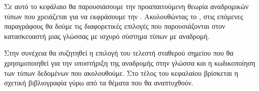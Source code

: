 Σε αυτό το κεφάλαιο θα παρουσιάσουμε την προαπαιτούμενη θεωρία αναδρομικών
τύπων που χρειάζεται για να εκφράσουμε την \FOMF. Ακολουθώντας το \cite{tapl},
στις επόμενες παραγράφους θα δούμε τις διαφορετικές επιλογές που παρουσιάζονται
στον κατασκευαστή μιας γλώσσας με ισχυρό σύστημα τύπων με αναδρομή.

Στην συνέχεια θα συζητηθεί η επιλογή του τελεστή σταθερού σημείου που θα
χρησιμοποιηθεί για την υποστήριξη της αναδρομής στην γλώσσα και η κωδικοποίηση
των τύπων δεδομένων που ακολουθούμε. Στο τέλος του κεφαλαίου βρίσκεται η
σχετική βιβλιογραφία γύρω από τα θέματα που θα αναπτυχθούν.
